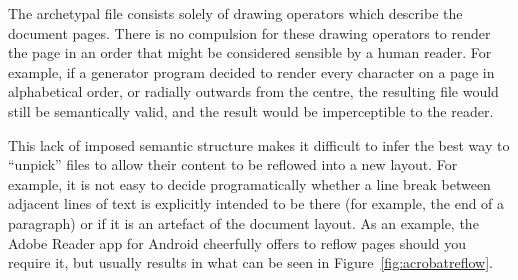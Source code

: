 The archetypal \pdf{} file consists solely of drawing operators which describe the document pages. There is no compulsion for these drawing operators to render the page in an order that might be considered sensible by a human reader. For example, if a \pdf{} generator program decided to render every character on a page in alphabetical order, or radially outwards from the centre, the resulting file would still be semantically valid, and the result would be imperceptible to the reader.

This lack of imposed semantic structure makes it difficult to infer the best way to ``unpick'' \pdf{} files to allow their content to be reflowed into a new layout. For example, it is not easy to decide programatically whether a line break between adjacent lines of text is explicitly intended to be there (for example, the end of a paragraph) or if it is an artefact of the document layout. As an example, the Adobe Reader app for Android cheerfully offers to reflow \pdf{} pages should you require it, but usually results in what can be seen in Figure~\ref{fig:acrobatreflow}.

